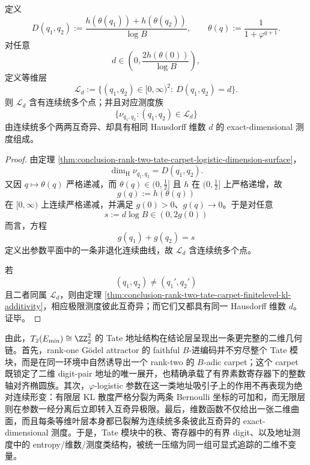 \begin{corollary}\label{cor:conclusion-rank-two-tate-carpet-isodimensional-singular-leaves}
定义
\[
D(q_1,q_2):=
\frac{h(\theta(q_1))+h(\theta(q_2))}{\log B},
\qquad
\theta(q):=\frac{1}{1+\varphi^{q+1}}.
\]
对任意
\[
d\in\left(0,\frac{2h(\theta(0))}{\log B}\right),
\]
定义等维层
\[
\mathcal L_d
:=
\{(q_1,q_2)\in[0,\infty)^2:\ D(q_1,q_2)=d\}.
\]
则 \(\mathcal L_d\) 含有连续统多个点；并且对应测度族
\[
\{\nu_{q_1,q_2}:(q_1,q_2)\in \mathcal L_d\}
\]
由连续统多个两两互奇异、却具有相同 Hausdorff 维数 \(d\) 的 exact-dimensional 测度组成。
\end{corollary}
\begin{proof}
由定理 \ref{thm:conclusion-rank-two-tate-carpet-logistic-dimension-surface}，
\[
\dim_{\mathrm H}\nu_{q_1,q_2}=D(q_1,q_2).
\]
又因 \(q\mapsto \theta(q)\) 严格递减，而 \(\theta(q)\in (0,\tfrac12]\) 且 \(h\) 在 \((0,\tfrac12]\) 上严格递增，故
\[
g(q):=h(\theta(q))
\]
在 \([0,\infty)\) 上连续严格递减，并满足 \(g(0)>0\)、\(g(q)\to 0\)。于是对任意
\[
s:=d\log B\in (0,2g(0))
\]
而言，方程
\[
g(q_1)+g(q_2)=s
\]
定义出参数平面中的一条非退化连续曲线，故 \(\mathcal L_d\) 含连续统多个点。

若
\[
(q_1,q_2)\neq (q_1',q_2')
\]
且二者同属 \(\mathcal L_d\)，则由定理 \ref{thm:conclusion-rank-two-tate-carpet-finitelevel-kl-additivity}，相应极限测度彼此互奇异；而它们又都具有同一 Hausdorff 维数 \(d\)。证毕。
\end{proof}

\noindent
由此，\(T_2(E_{\min})\cong \ZZ_2^2\) 的 Tate 地址结构在结论层呈现出一条更完整的二维几何链。首先，rank-one Gödel attractor 的 faithful \(B\)-进编码并不穷尽整个 Tate 模块，而是在同一环境中自然诱导出一个 rank-two 的 \(B\)-adic carpet；这个 carpet 既锁定了二维 digit-pair 地址的唯一展开，也精确承载了有界素数寄存器下的整数轴对齐椭圆族。其次，\(\varphi\)-logistic 参数在这一类地址吸引子上的作用不再表现为绝对连续形变：有限层 KL 散度严格分裂为两条 Bernoulli 坐标的可加和，而无限层则在参数一经分离后立即转入互奇异极限。最后，维数函数不仅给出一张二维曲面，而且每条等维叶层本身都已裂解为连续统多条彼此互奇异的 exact-dimensional 测度。于是，Tate 模块中的秩、寄存器中的有界 digit、以及地址测度中的 entropy/维数/测度类结构，被统一压缩为同一组可显式追踪的二维不变量。

\endinput
